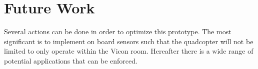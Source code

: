 \section{Future Work}
Several actions can be done in order to optimize this prototype. The most significant is to implement on board sensors such that the quadcopter will not be limited to only operate within the Vicon room. Hereafter there is a wide range of potential applications that can be enforced.

